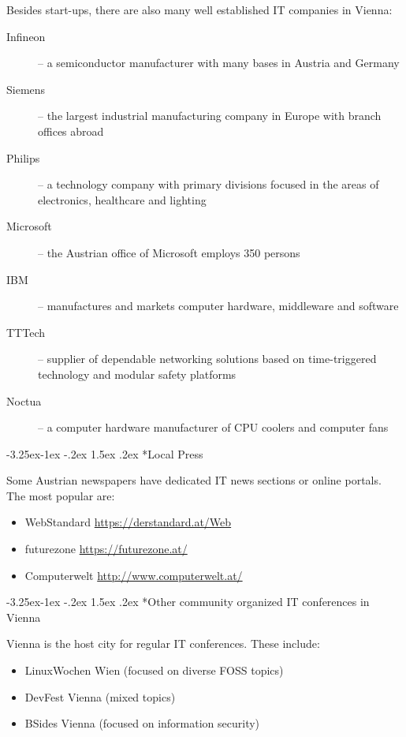 \documentclass[10pt,a4paper]{article}
\makeatletter
\renewcommand\subsection{%
\@startsection{subsection}{2}{\z@}%
              {-3.25ex\@plus -1ex \@minus -.2ex}%
              {1.5ex \@plus .2ex}%
              {\color{kdelight}\sffamily\Large\bfseries}}
\makeatother
\begin{document}
Besides start-ups, there are also many well established IT companies in Vienna:
\begin{description}
	\item[\color{kdedarker} Infineon] -- a semiconductor manufacturer with many bases in Austria and Germany
	\item[\color{kdedarker} Siemens] -- the largest industrial manufacturing company in Europe with branch offices abroad
	\item[\color{kdedarker} Philips] -- a technology company with primary divisions focused in the areas of electronics, healthcare and lighting
	\item[\color{kdedarker} Microsoft] -- the Austrian office of Microsoft employs 350 persons
	\item[\color{kdedarker} IBM] -- manufactures and markets computer hardware, middleware and software
	\item[\color{kdedarker} TTTech] -- supplier of dependable networking solutions based on time-triggered technology and modular safety platforms
	\item[\color{kdedarker} Noctua] -- a computer hardware manufacturer of CPU coolers and computer fans 
\end{description}

\subsection*{Local Press}
Some Austrian newspapers have dedicated IT news sections or online portals. The most popular are:

\begin{itemize}
\item WebStandard \url{https://derstandard.at/Web}
\item futurezone \url{https://futurezone.at/}
\item Computerwelt \url{http://www.computerwelt.at/}
\end{itemize}


\subsection*{Other community organized IT conferences in Vienna}
Vienna is the host city for regular IT conferences. These include:

\begin{itemize}
	\item LinuxWochen Wien (focused on diverse FOSS topics)
	\item DevFest Vienna (mixed topics)
	\item BSides Vienna (focused on information security)
\end{itemize}
\end{document}
